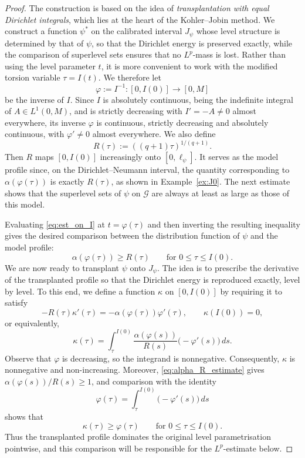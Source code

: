 \documentclass[12pt,a4paper]{article}
\numberwithin{equation}{section}
\begin{document}
	\begin{proof}
	The construction is based on the idea of \emph{transplantation with equal
		Dirichlet integrals}, which lies at the heart of the
	Kohler--Jobin method. We construct a function $\psi^*$ on the calibrated
	interval $J_\psi$ whose level structure is determined by that of $\psi$,
	so that the Dirichlet energy is preserved exactly, while the comparison
	of superlevel sets ensures that no $L^p$-mass is lost. Rather than using
	the level parameter $t$, it is more convenient to work with the modified
	torsion variable $\tau=I(t)$. We therefore let
	\[
	\varphi:=I^{-1}:[0,I(0)]\to[0,M]
	\]
	be the inverse of $I$. Since $I$ is absolutely continuous, being the
	indefinite integral of $A\in L^1(0,M)$, and is strictly decreasing with
	$I'=-A\neq0$ almost everywhere, its inverse $\varphi$ is continuous,
	strictly decreasing and absolutely
	continuous, with $\varphi'\neq0$ almost everywhere. We also define
	\[
	R(\tau):=((q+1)\tau)^{1/(q+1)}.
	\]
	Then $R$ maps $[0,I(0)]$ increasingly onto $[0,\ell_\psi]$. It serves as
	the model profile since, on the Dirichlet--Neumann interval, the quantity
	corresponding to $\alpha(\varphi(\tau))$ is exactly $R(\tau)$, as shown
	in Example~\ref{ex:J0}. The next estimate shows that the superlevel sets
	of $\psi$ on $\mathcal G$ are always at least as large as those of this
	model.
	
	Evaluating \eqref{eq:est_on_I} at $t=\varphi(\tau)$ and then inverting the
	resulting inequality gives the desired comparison between the
	distribution function of $\psi$ and the model profile:
	\begin{equation}
		\label{eq:alpha_R_estimate}
		\alpha(\varphi(\tau))
		\ge
		R(\tau)
		\qquad
		\text{for }0\le \tau\le I(0).
	\end{equation}
	We are now ready to transplant $\psi$ onto $J_\psi$. The idea is to
	prescribe the derivative of the transplanted profile so that the
	Dirichlet energy is reproduced exactly, level by level. To this end, we
	define a function $\kappa$ on $[0,I(0)]$ by requiring it to satisfy
	\[
	-R(\tau)\kappa'(\tau)
	=
	-\alpha(\varphi(\tau))\varphi'(\tau),
	\qquad
	\kappa(I(0))=0,
	\]
	or equivalently,
	\[
	\kappa(\tau)
	=
	\int_\tau^{I(0)}
	\frac{\alpha(\varphi(s))}{R(s)}
	\bigl(-\varphi'(s)\bigr)\,ds.
	\]
	Observe that $\varphi$ is decreasing, so the integrand is nonnegative.
	Consequently, $\kappa$ is nonnegative and non-increasing. Moreover,
	\eqref{eq:alpha_R_estimate} gives
	$\alpha(\varphi(s))/R(s)\ge1$, and comparison with the identity
	\[
	\varphi(\tau)
	=
	\int_\tau^{I(0)}
	\bigl(-\varphi'(s)\bigr)\,ds
	\]
	shows that
	\[
	\kappa(\tau)\ge\varphi(\tau)
	\qquad
	\text{for }0\le\tau\le I(0).
	\]
	Thus the transplanted profile dominates the original level
	parametrisation pointwise, and this comparison will be responsible for
	the $L^p$-estimate below.
	

\end{proof}
\end{document}

